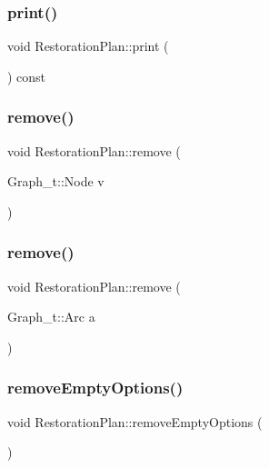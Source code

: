 \subsubsection{\texorpdfstring{print()}{print()}}
{\footnotesize\ttfamily void Restoration\+Plan\+::print (\begin{DoxyParamCaption}{ }\end{DoxyParamCaption}) const}

\mbox{\label{class_restoration_plan_a59da0a26384e50e4615bcffa926b2d69}} 
\subsubsection{\texorpdfstring{remove()}{remove()}\hspace{0.1cm}{\footnotesize\ttfamily [1/2]}}
{\footnotesize\ttfamily void Restoration\+Plan\+::remove (\begin{DoxyParamCaption}\item[{Graph\+\_\+t\+::\+Node}]{v }\end{DoxyParamCaption})}

\mbox{\label{class_restoration_plan_ae75f389f03e4fcb76b691ab383452142}} 
\subsubsection{\texorpdfstring{remove()}{remove()}\hspace{0.1cm}{\footnotesize\ttfamily [2/2]}}
{\footnotesize\ttfamily void Restoration\+Plan\+::remove (\begin{DoxyParamCaption}\item[{Graph\+\_\+t\+::\+Arc}]{a }\end{DoxyParamCaption})}

\mbox{\label{class_restoration_plan_a8be9afd54fef1a4bcd2746c8d8dca3d9}} 
\subsubsection{\texorpdfstring{remove\+Empty\+Options()}{removeEmptyOptions()}}
{\footnotesize\ttfamily void Restoration\+Plan\+::remove\+Empty\+Options (\begin{DoxyParamCaption}{ }\end{DoxyParamCaption})}

